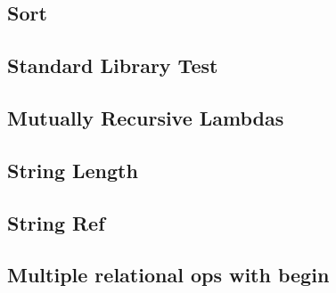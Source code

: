 \subsection*{Sort}


\subsection*{Standard Library Test}

\clearpage

\subsection*{Mutually Recursive Lambdas}


\subsection*{String Length}


\subsection*{String Ref}


\subsection*{Multiple relational ops with begin}

\clearpage

